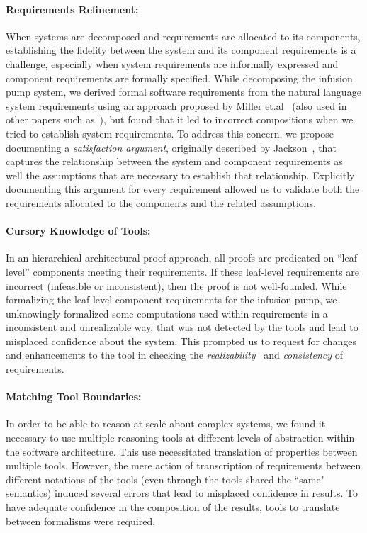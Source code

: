 \paragraph{\textbf{Requirements Refinement:}} When systems are decomposed and requirements are allocated to its components, establishing the fidelity between the system and its component requirements is a challenge, especially when system requirements are informally expressed and component requirements are formally specified. While decomposing the infusion pump system, we derived formal software requirements from the natural language system requirements using an approach proposed by Miller et.al~\cite{Miller01:dasc} (also used in other papers such as~\cite{jeffords2010model,kauppinen2007re, lempia2009requirements}), but found that it led to incorrect compositions when we tried to establish system requirements. %
To address this concern, we propose documenting a \emph{satisfaction argument}, originally described by Jackson~\cite{jackson1995world}, that captures the relationship between the system and component requirements as well the assumptions that are necessary to establish that relationship. Explicitly documenting this argument for every requirement allowed us to validate both the requirements allocated to the components and the related assumptions.
\vspace{-0.15in}
\paragraph{\textbf{Cursory Knowledge of Tools:}} In an hierarchical architectural proof approach, all proofs are predicated on ``leaf level'' components meeting their requirements. If these leaf-level requirements are incorrect (infeasible or inconsistent), then the proof is not well-founded. While formalizing the leaf level component requirements for the infusion pump, we unknowingly formalized some computations used within requirements in a inconsistent and unrealizable way, that was not detected by the tools and lead to misplaced confidence about the system. This prompted us to request for changes and enhancements to the tool in checking the {\em realizability}~\cite{gacek2015towards} and {\em consistency} of requirements.
\vspace{-0.15in}
\paragraph{\textbf{Matching Tool Boundaries:}} In order to be able to reason at scale about complex systems, we found it necessary to use multiple reasoning tools at different levels of abstraction within the software architecture. This use necessitated translation of properties between multiple tools. However, the mere action of transcription of requirements between different notations of the tools (even through the tools shared the ``same" semantics) induced several errors that lead to misplaced confidence in results. To have adequate confidence in the composition of the results, tools to translate between formalisms were required.

